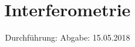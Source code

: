 

\subject{V64}
\title{Interferometrie}
\date{
  Durchführung: 
  \hspace{3em}
  Abgabe: 15.05.2018
}



\maketitle
\thispagestyle{empty}
\tableofcontents
\newpage
\setcounter{page}{1}





\printbibliography


